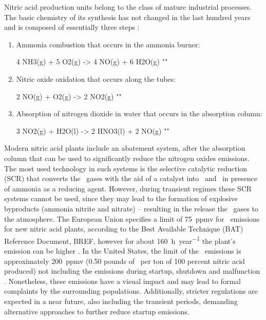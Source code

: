 \documentclass[journal=jacsat,manuscript=article]{achemso}
\newcommand{\nox}{\ce{NO_{\rmfamily{x}}}}
\newcommand{\ndois}{\ce{N2}}
\newcommand{\hdoiso}{\ce{H2O}}
\begin{document}
Nitric acid production units belong to the class of mature industrial processes. 
The basic chemistry of its
synthesis has not changed in
the last hundred years and is composed of essentially three steps
\citep{EPA2012}:
\vspace{-2mm}
\begin{enumerate}
	\setlength{\itemsep}{-10mm}
	\item Ammonia combustion that occurs in the ammonia burner: \vspace{-7mm}
	\begin{reactions} 4 NH3(g) + 5 O2(g) -> 4 NO(g) + 6 H2O(g)  "\label{rx:NH3comb}"	 \end{reactions} 
	\item Nitric oxide oxidation that occurs along the tubes:
	\vspace{-7mm}
	\begin{reactions}
		2 NO(g) + O2(g) -> 2 NO2(g)     "\label{rxn:NOoxid}"
	\end{reactions}
	\item Absorption of nitrogen dioxide in water that occurs in the absorption column:
	\vspace{-7mm}
	\begin{reactions}
		3 NO2(g) + H2O(l) -> 2 HNO3(l) + 2 NO(g)  "\label{rxn:NO2abs}"
	\end{reactions}
\end{enumerate}
	\vspace{-7mm}
Modern nitric acid plants include an abatement system, after the absorption column that can be used to significantly reduce the nitrogen oxides emissions. 
The most used technology in such systems is the selective catalytic reduction (SCR) that converts the \nox~gases with the aid of a catalyst into \ndois~and \hdoiso~in presence of ammonia as a reducing agent. 
However,
 during transient regimes these SCR systems cannot be used, since they may lead to the formation of explosive byproducts (ammonia nitrite and nitrate) -- resulting in the release the \nox~gases to the atmosphere.
The European Union specifies a limit of \SI{75}{ppmv} for \nox~emissions for new nitric acid plants, according to the Best Available Technique (BAT) Reference Document, BREF, however for about \SI{160}{\hour \per year} the plant's emission can be higher \cite{Groves2009}. 
In the United States, the limit of the \nox~emissions is approximately \SI{200}{ppmv} (0.50 pounds of \nox~per ton of 100 percent nitric acid
produced) not including the emissions during startup, shutdown and malfunction \cite{EPA2012}.
 Nonetheless, these emissions have a visual impact and may lead to formal complaints by the surrounding populations. Additionally, stricter regulations are expected in a near future, also including the transient periods, demanding alternative approaches to further reduce startup emissions. 
\end{document}
